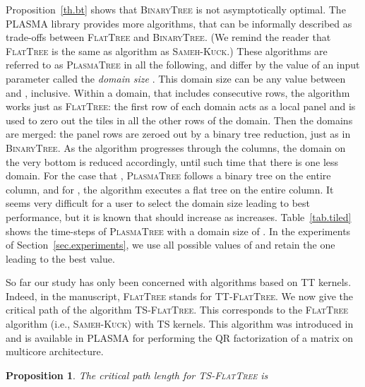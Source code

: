 \documentclass[a4paper,twopages]{article}
\newtheorem{proposition}{Proposition}
\newcommand{\TSFT}{\textsc{TS-FlatTree}\xspace}
\newcommand{\TTFT}{\textsc{TT-FlatTree}\xspace}
\newcommand{\SK}{\textsc{Sameh-Kuck}\xspace}
\newcommand{\BT}{\textsc{BinaryTree}\xspace}
\newcommand{\FT}{\textsc{FlatTree}\xspace}
\newcommand{\PT}{\textsc{PlasmaTree}\xspace}
\begin{document}
Proposition~\ref{th.bt} shows that \BT is not asymptotically optimal.
The PLASMA library provides more
algorithms, that can be informally described as trade-offs between \FT and \BT.
(We remind the reader that \FT is the same as algorithm as \SK.)
These algorithms are referred to as \PT in all the following, and differ by the
value of an input parameter called the \emph{domain size} .
This domain size can be any value between  and
, inclusive.  Within a domain, that includes  consecutive rows,
the algorithm works just as \FT: the
first row of each domain acts as a local panel and is used to zero out the
tiles in all the other rows of the domain. Then the domains are merged: the panel rows
are zeroed out by a binary tree reduction, just as in \BT.
As the algorithm progresses through the columns, the
domain on the very bottom is reduced accordingly, until such time that there is
one less domain.  For the case that , \PT follows a
binary tree on the entire column, and for , the algorithm executes a
flat tree on the entire column.  It seems very
difficult for a user to select the domain size  leading to best performance,
but it is known that  should increase as  increases. Table~\ref{tab.tiled}
shows the time-steps of \PT with a domain size of .
In the experiments of
Section~\ref{sec.experiments}, we use all possible values of  and retain
the one leading to the best value.

So far our study has only been concerned with algorithms based on TT kernels.
Indeed, in the manuscript, \FT stands for \TTFT.  We now give the critical path
of the algorithm \TSFT. This corresponds to the \FT algorithm (i.e., \SK) with
TS kernels. This algorithm was introduced
in~\cite{Buttari2008,tileplasma,Quintana:2009} and is available in PLASMA for
performing the QR factorization of a matrix on multicore architecture.

\begin{proposition} The critical path length for \TSFT is
\label{prop:tsft}
      
\end{proposition}
\end{document}
